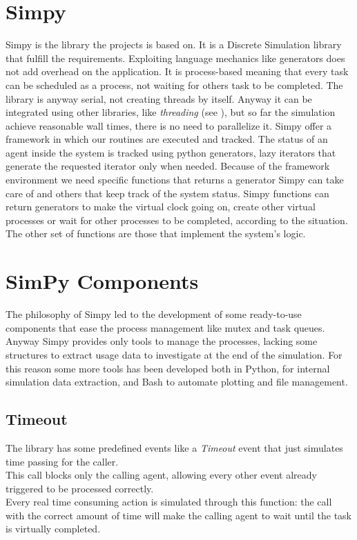 \section{Simpy}\label{simpy}
Simpy is the library the projects is based on. It is a Discrete Simulation
library that fulfill the requirements. Exploiting language mechanics like
generators does not add overhead on the application. It is process-based
meaning that every task can be scheduled as a process, not waiting for others
task to be completed. The library is anyway serial, not creating threads by
itself. Anyway it can be integrated using other libraries, like \textit{threading} (see
\cite{threading}), but so far the simulation achieve reasonable wall times,
there is no need to parallelize it.
Simpy offer a framework in which our routines are executed and tracked. The
status of an agent inside the system is tracked using python generators,
lazy iterators that generate the requested iterator only when needed. Because of
the framework environment we need specific functions that returns a generator
Simpy can take care of and others that keep track of the system status. Simpy
functions can return generators to make the virtual clock going on, create other
virtual processes or wait for other processes to be completed, according to the
situation. The other set of functions are those that implement the system's logic.

\section{SimPy Components}
The philosophy of Simpy led to the development of some ready-to-use components
that ease the process management like mutex and task queues.
Anyway Simpy provides only tools to manage the processes, lacking some
structures to extract usage data to investigate at the end of the simulation.
For this reason some more tools has been developed both in Python, for internal
simulation data extraction, and Bash to automate plotting and file management.

\subsection{Timeout}
The library has some predefined events like a \textit{Timeout} event that just
simulates time passing for the caller.\\
This call blocks only the calling agent, allowing every other event already
triggered to be processed correctly. \\
Every real time consuming action is simulated through this function: the call
with the correct amount of time will make the calling agent to wait until the
task is virtually completed.

